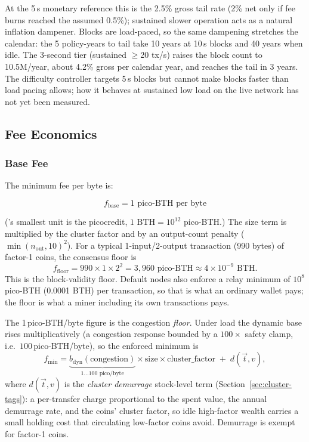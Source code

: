 At the 5\,s monetary reference this is the 2.5\% gross tail rate (2\% net
only if fee burns reached the assumed 0.5\%); sustained slower operation acts
as a natural inflation dampener. Blocks are load-paced, so the same
dampening stretches the calendar: the 5 policy-years to tail take 10 years at
10\,s blocks and 40 years when idle. The 3-second tier (sustained $\geq$20
tx/s) raises the block count to 10.5M/year, about 4.2\% gross per calendar
year, and reaches the tail in 3 years. The difficulty controller targets 5\,s
blocks but cannot make blocks faster than load pacing allows; how it behaves
at sustained low load on the live network has not yet been measured.

\subsection{Fee Economics}

\subsubsection{Base Fee}

The minimum fee per byte is:

\begin{equation}
f_{\text{base}} = 1 \text{ pico-BTH per byte}
\end{equation}

(\Botho's smallest unit is the picocredit, $1\text{ BTH} = 10^{12}$ pico-BTH.)
The size term is multiplied by the cluster factor and by an output-count
penalty ($\min(n_{\text{out}}, 10)^2$). For a typical 1-input/2-output
transaction (990 bytes) of factor-1 coins, the consensus floor is
\begin{equation}
f_{\text{floor}} = 990 \times 1 \times 2^2 = 3{,}960 \text{ pico-BTH} \approx 4 \times 10^{-9} \text{ BTH}.
\end{equation}
This is the block-validity floor. Default nodes also enforce a relay minimum of
$10^{8}$ pico-BTH (0.0001 BTH) per transaction, so that is what an ordinary
wallet pays; the floor is what a miner including its own transactions pays.

The 1\,pico-BTH/byte figure is the congestion \emph{floor}. Under load the
dynamic base rises multiplicatively (a congestion response bounded by a
$100\times$ safety clamp, i.e.\ $100$\,pico-BTH/byte), so the enforced
minimum is
\begin{equation}
f_{\min} = \underbrace{b_{\text{dyn}}(\text{congestion})}_{1\ldots100\text{ pico/byte}}
           \times \text{size} \times \text{cluster\_factor}
           \;+\; d(\vec{t}, v),
\end{equation}
where $d(\vec{t}, v)$ is the \emph{cluster demurrage} stock-level term
(Section~\ref{sec:cluster-tags}): a per-transfer charge proportional to the
spent value, the annual demurrage rate, and the coins' cluster factor, so
idle high-factor wealth carries a small holding cost that circulating
low-factor coins avoid. Demurrage is exempt for factor-1 coins.

